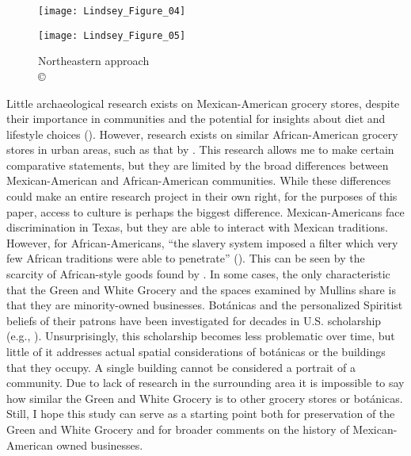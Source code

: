 \begin{figure}[!tb]
\begin{minipage}[t]{.49\linewidth}
	\texttt{[image: Lindsey\_Figure\_04]}
	\caption{Historic photo of the structure\\
		{\normalfont\scriptsize %
		Source:  \textcite{anon}.
	}}
	\label{fig:Lindsey_Figure_04}
\end{minipage}\hfill
\begin{minipage}[t]{.49\linewidth}
	\texttt{[image: Lindsey\_Figure\_05]}
	\caption{Northeastern approach\\
		{\normalfont\scriptsize \copyright\
			\shortauthor
	}}
	\label{fig:Lindsey_Figure_05}
\end{minipage}
\end{figure}

Little archaeological research exists on Mexican-American grocery stores, despite their importance in communities and the potential for insights about diet and lifestyle choices (\cite[279]{kreneck}). However, research exists on similar African-American grocery stores in urban areas, such as that by \textcite{mullins}. This research allows me to make certain comparative statements, but they are limited by the broad differences between Mexican-American and African-American communities. While these differences could make an entire research project in their own right, for the purposes of this paper, access to culture is perhaps the biggest difference. Mexican-Americans face discrimination in Texas, but they are able to interact with Mexican traditions. However, for African-Americans, “the slavery system imposed a filter which very few African traditions were able to penetrate” (\cite[122]{morner}). This can be seen by the scarcity of African-style goods found by \textcite{mullins}. In some cases, the only characteristic that the Green and White Grocery and the spaces examined by Mullins share is that they are minority-owned businesses.
Botánicas and the personalized Spiritist beliefs of their patrons have been investigated for decades in U.S. scholarship (e.g., \cites{delgado}{fisch}{romberg2005}). Unsurprisingly, this scholarship becomes less problematic over time, but little of it addresses actual spatial considerations of botánicas or the buildings that they occupy. A single building cannot be considered a portrait of a community. Due to lack of research in the surrounding area it is impossible to say how similar the Green and White Grocery is to other grocery stores or botánicas. Still, I hope this study can serve as a starting point both for preservation of the Green and White Grocery and for broader comments on the history of Mexican-American owned businesses.


